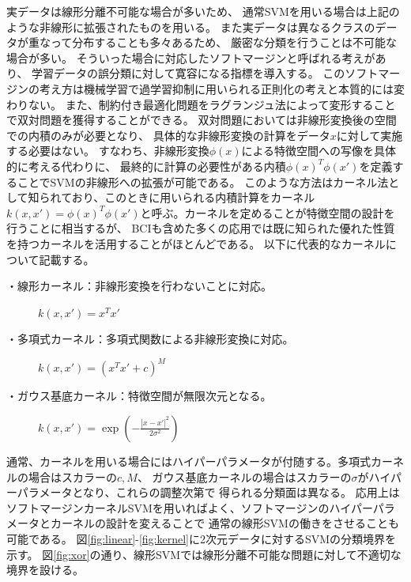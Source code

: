 実データは線形分離不可能な場合が多いため、
通常SVMを用いる場合は上記のような非線形に拡張されたものを用いる。
また実データは異なるクラスのデータが重なって分布することも多々あるため、
厳密な分類を行うことは不可能な場合が多い。
そういった場合に対応したソフトマージンと呼ばれる考えがあり、
学習データの誤分類に対して寛容になる指標を導入する。
このソフトマージンの考え方は機械学習で過学習抑制に用いられる正則化の考えと本質的には変わりない。
また、制約付き最適化問題をラグランジュ法によって変形することで双対問題を獲得することができる。
双対問題においては非線形変換後の空間での内積のみが必要となり、
具体的な非線形変換の計算をデータ\(x\)に対して実施する必要はない。
すなわち、非線形変換\(\phi(x)\)による特徴空間への写像を具体的に考える代わりに、
最終的に計算の必要性がある内積\(\phi(x)^T\phi(x')\)を定義することでSVMの非線形への拡張が可能である。
このような方法はカーネル法として知られており、このときに用いられる内積計算をカーネル
\(k(x,x')=\phi(x)^T\phi(x')\)と呼ぶ。カーネルを定めることが特徴空間の設計を行うことに相当するが、
BCIも含めた多くの応用では既に知られた優れた性質を持つカーネルを活用することがほとんどである。
以下に代表的なカーネルについて記載する。
\begin{description}
    \item[・線形カーネル：非線形変換を行わないことに対応。] \mbox{}
    \begin{center} \(k(x,x')=x^Tx'\) \end{center}
    \item[・多項式カーネル：多項式関数による非線形変換に対応。] \mbox{} 
    \begin{center} \(k(x,x')=(x^Tx' + c)^M\) \end{center}
    \item[・ガウス基底カーネル：特徴空間が無限次元となる。] \mbox{}\par
    \begin{center} \(k(x,x')=\exp\left(-\frac{|x-x'|^2}{2\sigma^2}\right)\) \end{center}
\end{description}
通常、カーネルを用いる場合にはハイパーパラメータが付随する。多項式カーネルの場合はスカラーの\(c,M\)、
ガウス基底カーネルの場合はスカラーの\(\sigma\)がハイパーパラメータとなり、これらの調整次第で
得られる分類面は異なる。
応用上はソフトマージンカーネルSVMを用いればよく、ソフトマージンのハイパーパラメータとカーネルの設計を変えることで
通常の線形SVMの働きをさせることも可能である。
図\ref{fig:linear}-\ref{fig:kernel}に2次元データに対するSVMの分類境界を示す。
図\ref{fig:xor}の通り、線形SVMでは線形分離不可能な問題に対して不適切な境界を設ける。
